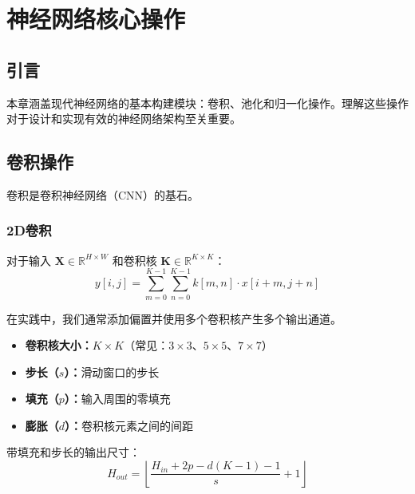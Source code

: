 \clearpage
\cleardoublepage

\chapter{神经网络核心操作}

\section{引言}

本章涵盖现代神经网络的基本构建模块：卷积、池化和归一化操作。理解这些操作对于设计和实现有效的神经网络架构至关重要。

\section{卷积操作}

卷积是卷积神经网络（CNN）的基石。

\subsection{2D卷积}

对于输入 $\mathbf{X} \in \mathbb{R}^{H \times W}$ 和卷积核 $\mathbf{K} \in \mathbb{R}^{K \times K}$：
\begin{equation}
y[i,j] = \sum_{m=0}^{K-1}\sum_{n=0}^{K-1} k[m,n] \cdot x[i+m, j+n]
\end{equation}

在实践中，我们通常添加偏置并使用多个卷积核产生多个输出通道。

\begin{properties}[卷积参数]
\begin{itemize}
    \item \textbf{卷积核大小：}$K \times K$（常见：$3\times3$、$5\times5$、$7\times7$）
    \item \textbf{步长（$s$）：}滑动窗口的步长
    \item \textbf{填充（$p$）：}输入周围的零填充
    \item \textbf{膨胀（$d$）：}卷积核元素之间的间距
\end{itemize}
\end{properties}

带填充和步长的输出尺寸：
\begin{equation}
H_{out} = \left\lfloor \frac{H_{in} + 2p - d(K-1) - 1}{s} + 1 \right\rfloor
\end{equation}

